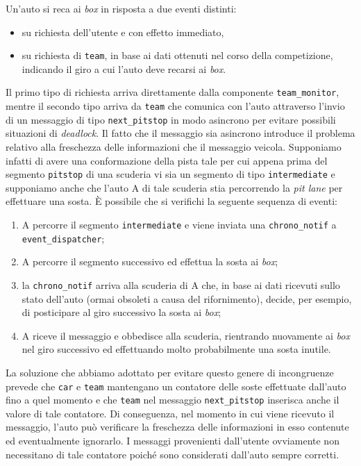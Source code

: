 \documentclass[11pt,a4paper]{report}
\newcommand{\fun}[1]{\texttt{#1}}
\begin{document}
Un'auto si reca ai \textit{box} in risposta a due eventi distinti:
\begin{itemize}
\item su richiesta dell'utente e con effetto immediato,
\item su richiesta di \texttt{team}, in base ai dati ottenuti nel corso della competizione, indicando il giro a cui l'auto deve recarsi ai \textit{box}.
\end{itemize}

Il primo tipo di richiesta arriva direttamente dalla componente \texttt{team\_monitor}, mentre il secondo tipo arriva da \texttt{team} che comunica con l'auto attraverso l'invio di un messaggio di tipo \texttt{next\_pitstop} in modo asincrono per evitare possibili situazioni di \textit{deadlock}. Il fatto che il messaggio sia asincrono introduce il problema relativo alla freschezza delle informazioni che il messaggio veicola. Supponiamo infatti di avere una conformazione della pista tale per cui appena prima del segmento \texttt{pitstop} di una scuderia vi sia un segmento di tipo \texttt{intermediate} e supponiamo anche che l'auto A di tale scuderia stia percorrendo la \textit{pit lane} per effettuare una sosta.
\`E possibile che si verifichi la seguente sequenza di eventi:
\begin{enumerate}
\item A percorre il segmento \texttt{intermediate} e viene inviata una \texttt{chrono\_notif} a \texttt{event\_dispatcher};
\item A percorre il segmento successivo ed effettua la sosta ai \textit{box};
\item la \texttt{chrono\_notif} arriva alla scuderia di A che, in base ai dati ricevuti sullo stato dell'auto (ormai obsoleti a causa del rifornimento), decide, per esempio, di posticipare al giro successivo la sosta ai \textit{box};
\item A riceve il messaggio e obbedisce alla scuderia, rientrando nuovamente ai \textit{box} nel giro successivo ed effettuando molto probabilmente una sosta inutile.
\end{enumerate}

La soluzione che abbiamo adottato per evitare questo genere di incongruenze prevede che \texttt{car} e \texttt{team} mantengano un contatore delle soste effettuate dall'auto fino a quel momento e che \texttt{team} nel messaggio \fun{next\_pitstop} inserisca anche il valore di tale contatore. Di conseguenza, nel momento in cui viene ricevuto il messaggio, l'auto può verificare la freschezza delle informazioni in esso contenute ed eventualmente ignorarlo. I messaggi provenienti dall'utente ovviamente non necessitano di tale contatore poiché sono considerati dall'auto sempre corretti.
\end{document}
